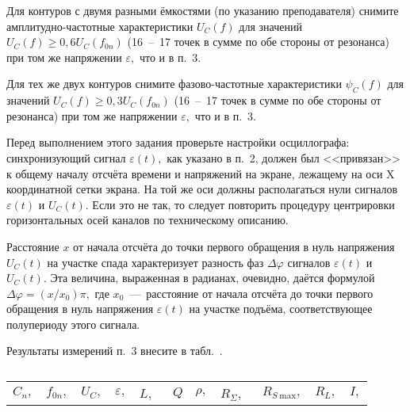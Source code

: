 \begin{lab:task}
    \item Для контуров с двумя разными ёмкостями (по указанию преподавателя)
снимите амплитудно-частотные характеристики $U_C(f)$ для значений
$U_C(f)\ge0,6U_C(f_{0n})$ (16~--~17 точек в сумме по обе стороны от резонанса)
при том же напряжении $\varepsilon,$ что и в п.~3.

    \item Для тех же двух контуров снимите фазово-частотные характеристики
$\psi_C(f)$ для значений $U_C(f)\ge0,3U_C(f_{0n})$ (16~--~17 точек в сумме по
обе стороны от резонанса) при том же напряжении $\varepsilon,$ что и в п.~3.

		    Перед выполнением этого задания проверьте настройки осциллографа:
синхронизующий сигнал $\varepsilon(t),$ как указано в п.~2, должен был
<<привязан>> к общему началу отсчёта времени и напряжений на экране, лежащему на
оси X координатной сетки экрана. На той же оси должны располагаться нули
сигналов $\varepsilon(t)$ и $U_C(t).$ Если это не так, то следует повторить
процедуру центрировки горизонтальных осей каналов по техническому описанию.

		    Расстояние $x$ от начала отсчёта до точки первого обращения в нуль
напряжения $U_C(t)$ на участке спада характеризует разность фаз $\Delta\varphi$
сигналов $\varepsilon(t)$ и $U_C(t).$ Эта величина, выраженная в радианах,
очевидно, даётся формулой $\Delta\varphi=(x/x_0)\pi,$ где $x_0$~---~расстояние
от начала отсчёта до точки первого обращения в нуль напряжения $\varepsilon(t)$
на участке подъёма, соответствующее полупериоду этого сигнала.



		    \item Результаты измерений п.~3 внесите в табл.~.
		    \begin{center}
		        \begin{table}[tb!]
		            \caption{}
		            \begin{center}
		                \begin{tabular}{|c|c|c|c|c|c|c|c|c|c|c|}
		                    \hline
		                    $C_n,$ & $f_{0n},$& $U_C,$& $\varepsilon,$ & $L,$~&
$Q$& $\rho,$ & $R_{\Sigma},$~& $R_{S~\text{max}},$& $R_L,$& $I,$\\


\end{tabular}
\end{center}
\end{table}
\end{center}
\end{lab:task}
